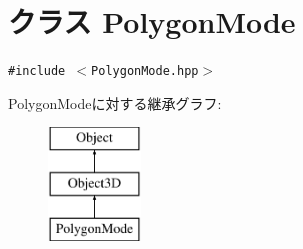 \hypertarget{classm3g_1_1PolygonMode}{
\section{クラス PolygonMode}
\label{classm3g_1_1PolygonMode}
}
{\tt \#include $<$PolygonMode.hpp$>$}

PolygonModeに対する継承グラフ:\begin{figure}[H]
\begin{center}
\leavevmode
\includegraphics[height=3cm]{classm3g_1_1PolygonMode}
\end{center}
\end{figure}
